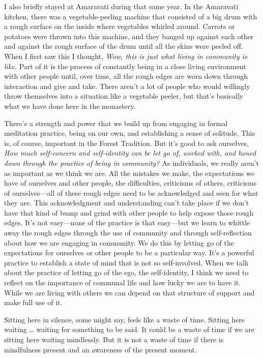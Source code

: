 I also briefly stayed at Amaravati during that same year. In the 
Amaravati kitchen, there was a vegetable-peeling machine that consisted 
of a big drum with a rough surface on the inside where vegetables 
whirled around. Carrots or potatoes were thrown into this machine, and 
they banged up against each other and against the rough surface of the 
drum until all the skins were peeled off. When I first saw this I 
thought, \emph{Wow, this is just what living in community is like.} 
Part of it is the process of constantly being in a close living 
environment with other people until, over time, all the rough edges are 
worn down through interaction and give and take. There aren't a lot of 
people who would willingly throw themselves into a situation like a 
vegetable peeler, but that's basically what we have done here in the 
monastery.

There's a strength and power that we build up from engaging in formal 
meditation practice, being on our own, and establishing a sense of 
solitude. This is, of course, important in the Forest Tradition. But 
it's good to ask ourselves, \emph{How much self-concern and 
self-identity can be let go of, worked with, and honed down through the 
practice of being in community?} As individuals, we really aren't as 
important as we think we are. All the mistakes we make, the 
expectations we have of ourselves and other people, the difficulties, 
criticisms of others, criticisms of ourselves---all of these rough 
edges need to be acknowledged and seen for what they are. This 
acknowledgment and understanding can't take place if we don't have that 
kind of bump and grind with other people to help expose those rough 
edges. It's not easy---none of the practice is that easy---but we learn 
to whittle away the rough edges through the use of community and 
through self-reflection about how we are engaging in community. We do 
this by letting go of the expectations for ourselves or other people to 
be a particular way. It's a powerful practice to establish a state of 
mind that is not so self-involved. When we talk about the practice of 
letting go of the ego, the self-identity, I think we need to reflect on 
the importance of communal life and how lucky we are to have it. While 
we are living with others we can depend on that structure of support 
and make full use of it.


Sitting here in silence, some might say, feels like a waste of time. 
Sitting here waiting \ldots{} waiting for something to be said. It 
could be a waste of time if we are sitting here waiting mindlessly. But 
it is not a waste of time if there is mindfulness present and an 
awareness of the present moment.

